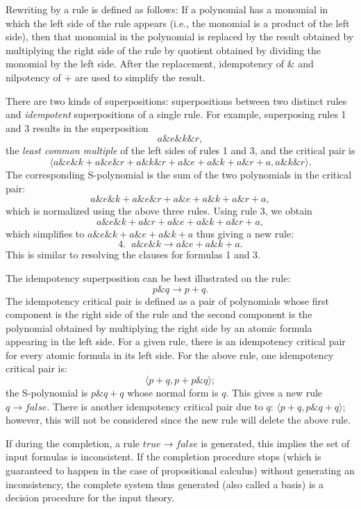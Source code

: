 Rewriting by a rule is defined as follows: If a polynomial has a
monomial in which the left side of the rule appears (i.e., the
monomial is a product of the left side), then that monomial in
the polynomial is replaced by the result obtained by multiplying
the right side of the rule by quotient obtained by dividing the
monomial by the left side. After the replacement, idempotency of
$\&$ and nilpotency of $+$ are used to simplify the result.

There are two kinds of superpositions: superpositions between two
distinct rules and {\it idempotent} superpositions of a single
rule. For example, superposing rules 1 and 3 results in the
superposition 
   \[a \& e \& k \& r, \]
the {\it least common multiple} of the
left sides of rules 1 and 3, and the critical pair is 
  \[ \langle a \& e \& k + a \& e \& r + a \& k \& r + a \& e + a \& k + a \& r + a, a \& k \& r\rangle . \]
The corresponding S-polynomial is the sum of the two polynomials
in the critical pair: 
 \[ a \& e \& k + a \& e \& r + a \& e + a \& k + a \& r + a,\]
which is normalized using the above three rules.
Using rule 3, we obtain 
  \[a \& e \& k + a \& r + a \& e + a \& k + a \& r + a,\]
which simplifies to $a \& e \& k + a \& e + a \& k + a$ thus
giving a new rule: 
  \[ 4. \; \; a \& e \& k \rightarrow a \& e + a \& k + a.\] 
This is similar to resolving the clauses for formulas 1
and 3.

The idempotency superposition can be best illustrated on the
rule: 
  \[ p \& q \rightarrow p + q.\] 
The idempotency critical
pair is defined as a pair of polynomials whose first component is
the right side of the rule and the second component is the
polynomial obtained by multiplying the right side by an atomic
formula appearing in the left side. For a given rule, there is an
idempotency critical pair for every atomic formula in its left
side. For the above rule, one idempotency critical pair is: 
   \[\langle p + q, p + p \& q\rangle ; \]
the S-polynomial is $p \& q + q$ whose normal
form is $q$. This gives a new rule $q \rightarrow false$. There
is another idempotency critical pair due to $q$: $\langle p + q, p \& q
+ q\rangle $; however, this will not be considered since the new rule
will delete the above rule.

If during the completion, a rule $true \rightarrow false$ is
generated, this implies the set of input formulas is
inconsistent. If the completion procedure stops
(which is guaranteed to happen in the case of propositional calculus)
without generating an inconsistency,
the complete system thus
generated (also called a \Groebner basis) is a decision procedure
for the input theory.

